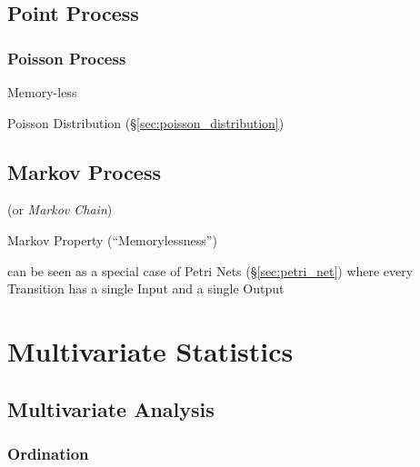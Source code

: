 \subsection{Point Process}\label{sec:point_process}

\subsubsection{Poisson Process}\label{sec:poisson_process}

Memory-less

Poisson Distribution (\S\ref{sec:poisson_distribution})



\subsection{Markov Process}\label{sec:markov_process}

(or \emph{Markov Chain})

Markov Property (``Memorylessness'')

can be seen as a special case of Petri Nets (\S\ref{sec:petri_net})
where every Transition has a single Input and a single Output



\section{Multivariate Statistics}\label{sec:multivariate_statistics}

\subsection{Multivariate Analysis}\label{sec:multivariate_analysis}

\subsubsection{Ordination}\label{sec:ordination}


